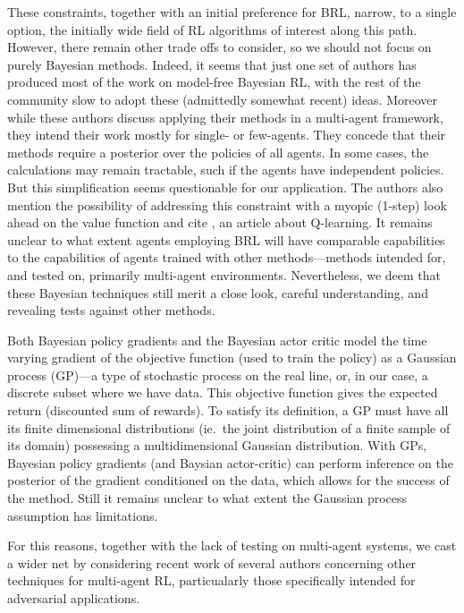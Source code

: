 \documentclass{article}
\begin{document}
These constraints, together with an initial preference for BRL,
narrow, to a single option, the initially wide field of RL algorithms
of interest along this path.  However, there remain other trade offs
to consider, so we should not focus on purely Bayesian methods.
Indeed, it seems that just one set of authors has produced most of the
work on model-free Bayesian RL, with the rest of the community slow to
adopt these (admittedly somewhat recent) ideas.  Moreover while these
authors discuss applying their methods in a multi-agent framework,
they intend their work mostly for single- or few-agents.  They concede
that their methods require a posterior over the policies of all
agents.  In some cases, the calculations may remain tractable, such if
the agents have independent policies.  But this simplification seems
questionable for our application.  The authors also mention the
possibility of addressing this constraint with a myopic (1-step) look
ahead on the value function and cite \cite{dearden1998bayesian}, an
article about Q-learning.  It remains unclear to what extent agents
employing BRL will have comparable capabilities to the capabilities of
agents trained with other methods---methods intended for, and tested
on, primarily multi-agent environments.  Nevertheless, we deem that
these Bayesian techniques still merit a close look, careful
understanding, and revealing tests against other methods.

Both Bayesian policy gradients and the Bayesian actor critic model the
time varying gradient of the objective function (used to train the
policy) as a Gaussian process (GP)---a type of stochastic process on
the real line, or, in our case, a discrete subset where we have data.
This objective function gives the expected return (discounted sum of
rewards).  To satisfy its definition, a GP must have all its finite
dimensional distributions (ie.\ the joint distribution of a finite
sample of its domain) possessing a multidimensional Gaussian
distribution. With GPs, Bayesian policy gradients (and Baysian
actor-critic) can perform inference on the posterior of the gradient
conditioned on the data, which allows for the success of the method.
Still it remains unclear to what extent the Gaussian process
assumption has limitations.

For this reasons, together with the lack of testing on multi-agent
systems, we cast a wider net by considering recent work of several
authors concerning other techniques for multi-agent RL, particualarly
those specifically intended for adversarial applications.
\end{document}
